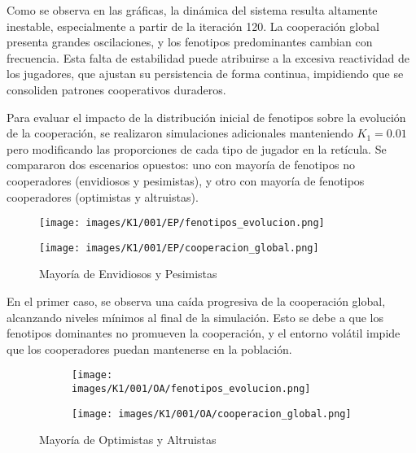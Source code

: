 \documentclass[a4paper,12pt]{report}
\begin{document}
Como se observa en las gráficas, la dinámica del sistema resulta altamente inestable, especialmente a partir de la iteración 120. La cooperación global presenta grandes oscilaciones, y los fenotipos predominantes cambian con frecuencia. Esta falta de estabilidad puede atribuirse a la excesiva reactividad de los jugadores, que ajustan su persistencia de forma continua, impidiendo que se consoliden patrones cooperativos duraderos.

Para evaluar el impacto de la distribución inicial de fenotipos sobre la evolución de la cooperación, se realizaron simulaciones adicionales manteniendo \( K_1 = 0.01 \) pero modificando las proporciones de cada tipo de jugador en la retícula. Se compararon dos escenarios opuestos: uno con mayoría de fenotipos no cooperadores (envidiosos y pesimistas), y otro con mayoría de fenotipos cooperadores (optimistas y altruistas).

\begin{figure}[h]
    \centering
    \begin{minipage}{0.49\textwidth}
    \centering
    \texttt{[image: images/K1/001/EP/fenotipos\_evolucion.png]}
    \label{fig:enter-label}
    \end{minipage}
    \hfill
    \begin{minipage}{0.49\textwidth}
    \centering
    \texttt{[image: images/K1/001/EP/cooperacion\_global.png]}
    \label{fig:enter-label}
    \end{minipage}
    \caption{Mayoría de Envidiosos y Pesimistas}
\end{figure}

\newpage

En el primer caso, se observa una caída progresiva de la cooperación global, alcanzando niveles mínimos al final de la simulación. Esto se debe a que los fenotipos dominantes no promueven la cooperación, y el entorno volátil impide que los cooperadores puedan mantenerse en la población.


\begin{figure}[h]
    \centering
    \begin{subfigure}[t]{0.49\textwidth}
        \centering
        \texttt{[image: images/K1/001/OA/fenotipos\_evolucion.png]}
        \label{fig:enter-label}
    \end{subfigure}
    \hfill
    \begin{subfigure}[t]{0.49\textwidth}
        \centering
        \texttt{[image: images/K1/001/OA/cooperacion\_global.png]}
        \label{fig:enter-label}
    \end{subfigure}
    \caption{Mayoría de Optimistas y Altruistas}
\end{figure}
\end{document}
